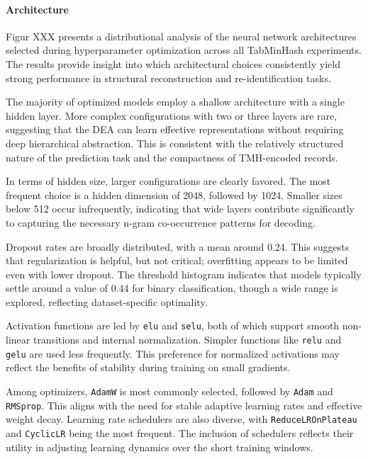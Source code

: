 \paragraph{Architecture}

Figur XXX presents a distributional analysis of the neural network architectures selected during hyperparameter optimization across all TabMinHash experiments. The results provide insight into which architectural choices consistently yield strong performance in structural reconstruction and re-identification tasks.

The majority of optimized models employ a shallow architecture with a single hidden layer. More complex configurations with two or three layers are rare, suggesting that the DEA can learn effective representations without requiring deep hierarchical abstraction. This is consistent with the relatively structured nature of the prediction task and the compactness of TMH-encoded records.

In terms of hidden size, larger configurations are clearly favored. The most frequent choice is a hidden dimension of 2048, followed by 1024. Smaller sizes below 512 occur infrequently, indicating that wide layers contribute significantly to capturing the necessary n-gram co-occurrence patterns for decoding.

Dropout rates are broadly distributed, with a mean around 0.24. This suggests that regularization is helpful, but not critical; overfitting appears to be limited even with lower dropout. The threshold histogram indicates that models typically settle around a value of 0.44 for binary classification, though a wide range is explored, reflecting dataset-specific optimality.

Activation functions are led by \texttt{elu} and \texttt{selu}, both of which support smooth non-linear transitions and internal normalization. Simpler functions like \texttt{relu} and \texttt{gelu} are used less frequently. This preference for normalized activations may reflect the benefits of stability during training on small gradients.

Among optimizers, \texttt{AdamW} is most commonly selected, followed by \texttt{Adam} and \texttt{RMSprop}. This aligns with the need for stable adaptive learning rates and effective weight decay. Learning rate schedulers are also diverse, with \texttt{ReduceLROnPlateau} and \texttt{CyclicLR} being the most frequent. The inclusion of schedulers reflects their utility in adjusting learning dynamics over the short training windows.


